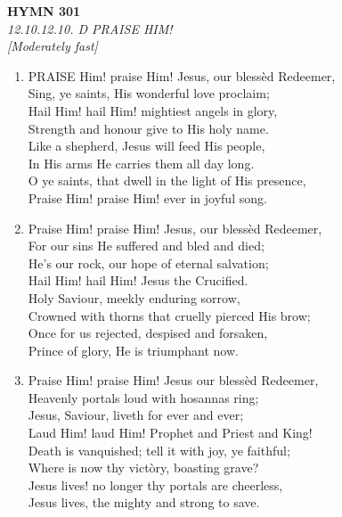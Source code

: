 \documentclass[11pt,a4paper]{article}
\begin{document}
\newpage
\begin{center}
    {\Large \textbf{HYMN 301}}
    \\
    \textit{12.10.12.10. D PRAISE HIM!}
    \\
    \textit{\small [Moderately fast]}
\end{center}
\vspace{1em}

\begin{enumerate}
    \item PRAISE Him! praise Him! Jesus, our bless\`ed Redeemer, \\
        Sing, ye saints, His wonderful love proclaim; \\
        Hail Him! hail Him! mightiest angels in glory, \\
        Strength and honour give to His holy name. \\
        Like a shepherd, Jesus will feed His people, \\
        In His arms He carries them all day long. \\
        O ye saints, that dwell in the light of His presence, \\
        Praise Him! praise Him! ever in joyful song.

    \item Praise Him! praise Him! Jesus, our bless\`ed Redeemer, \\
        For our sins He suffered and bled and died; \\
        He's our rock, our hope of eternal salvation; \\
        Hail Him! hail Him! Jesus the Crucified. \\
        Holy Saviour, meekly enduring sorrow, \\
        Crowned with thorns that cruelly pierced His brow; \\
        Once for us rejected, despised and forsaken, \\
        Prince of glory, He is triumphant now.

    \item Praise Him! praise Him! Jesus our bless\`ed Redeemer, \\
        Heavenly portals loud with hosannas ring; \\
        Jesus, Saviour, liveth for ever and ever; \\
        Laud Him! laud Him! Prophet and Priest and King! \\
        Death is vanquished; tell it with joy, ye faithful; \\
        Where is now thy vict\`ory, boasting grave? \\
        Jesus lives! no longer thy portals are cheerless, \\
        Jesus lives, the mighty and strong to save.

\end{enumerate}
\end{document}
